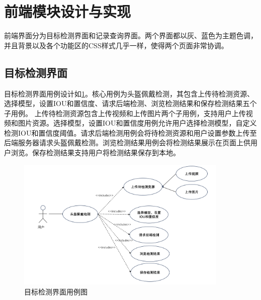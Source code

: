 \section{前端模块设计与实现}
前端界面分为目标检测界面和记录查询界面。两个界面都以灰、蓝色为主题色调，并且背景以及各个功能区的CSS样式几乎一样，使得两个页面非常协调。
\subsection{目标检测界面}
目标检测界面用例设计如\ref{fig:uml1}。核心用例为头盔佩戴检测，其包含上传待检测资源、选择模型，设置IOU和置信度、请求后端检测、浏览检测结果和保存检测结果五个子用例。
上传待检测资源包含上传视频和上传图片两个子用例，支持用户上传视频和图片资源。选择模型，设置IOU和置信度用例允许用户选择检测模型，自定义检测IOU和置信度阈值。请求后端检测用例会将待检测资源和用户设置参数上传至后端服务器请求头盔佩戴检测。浏览检测结果用例会将检测结果展示在页面上供用户浏览。保存检测结果支持用户将检测结果保存到本地。
\begin{figure}[!htb]
    \centering
    \includegraphics[width=0.9\textwidth]{figs/chap05/uml1.png}
    \caption{目标检测界面用例图}
    \label{fig:uml1}
\end{figure}

